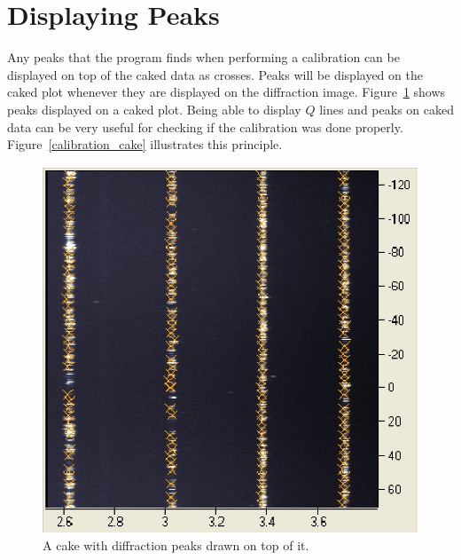 \section{Displaying Peaks}\label{displaying_peaks_cake}

Any peaks that the program finds when performing
a calibration can be displayed on top of the caked
data as crosses. Peaks will be displayed on the caked plot whenever 
they are displayed on the diffraction image. 
Figure~\ref{peaks_on_cake_image} 
shows peaks displayed on a caked plot.  Being able to display 
$Q$ lines and peaks on caked data can be very useful for 
checking if the calibration was done properly. 
Figure~\ref{calibration_cake} illustrates this principle.

\begin{figure}
    \centering
    \includegraphics[scale=.75]{figures/peaks_on_cake_image.eps}
    \caption{A cake with diffraction 
    peaks drawn on top of it.}
    \label{peaks_on_cake_image}
\end{figure}

